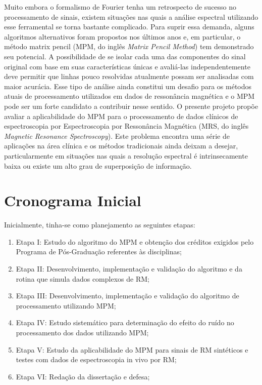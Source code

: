 \documentclass[12pt]{article}
\begin{document}
Muito embora o formalismo de Fourier tenha um retrospecto de sucesso no
processamento de sinais, existem situações nas quais a análise espectral utilizando
esse ferramental se torna bastante complicado. Para suprir essa demanda, alguns
algoritmos alternativos foram propostos nos últimos anos e, em particular, o método
matrix pencil (MPM, do inglês \textit{Matrix Pencil Method}) tem demonstrado seu potencial.
A possibilidade de se isolar cada uma das componentes do sinal original com base
em suas características únicas e avaliá-las independentemente deve permitir que
linhas pouco resolvidas atualmente possam ser analisadas com maior acurácia.
Esse tipo de análise ainda constitui um desafio para os métodos atuais de
processamento utilizados em dados de ressonância magnética e o MPM pode ser
um forte candidato a contribuir nesse sentido. O presente projeto propõe avaliar a
aplicabilidade do MPM para o processamento de dados clínicos de espectroscopia
por Espectroscopia por Ressonância Magnética (MRS, do inglês \textit{Magnetic Resonance Spectroscopy}). Este problema encontra uma série de aplicações na área clínica e os
métodos tradicionais ainda deixam a desejar, particularmente em situações nas
quais a resolução espectral é intrinsecamente baixa ou existe um alto grau de
superposição de informação.

\section{Cronograma Inicial}
\label{sec:cronograma}

Inicialmente, tinha-se como planejamento as seguintes etapas:

\begin{enumerate}
    \item  Etapa I: Estudo do algoritmo do MPM e obtenção dos créditos exigidos pelo
    Programa de Pós-Graduação referentes às disciplinas;
    \item  Etapa II: Desenvolvimento, implementação e validação do algoritmo e da
    rotina que simula dados complexos de RM;
    \item  Etapa III: Desenvolvimento, implementação e validação do algoritmo de
    processamento utilizando MPM;
    \item  Etapa IV: Estudo sistemático para determinação do efeito do ruído no
    processamento dos dados utilizando MPM;
    \item  Etapa V: Estudo da aplicabilidade do MPM para sinais de RM sintéticos e
    testes com dados de espectroscopia in vivo por RM;
    \item  Etapa VI: Redação da dissertação e defesa;
\end{enumerate}
\end{document}
